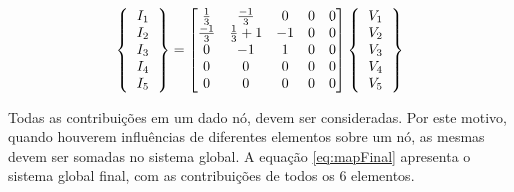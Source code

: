 \documentclass[
    12pt,               %
    openright,          %
    oneside,
    a4paper,            %
    english,            %
    french,             %
    spanish,            %
    brazil              %
    ]{abntex2}
\begin{document}
  \begin{equation}
     \label{eq:mapE2}
	\left \{
     \begin{tabular}{c}
         $I_1$ \\
         $I_2$ \\
         $I_3$ \\
         $I_4$ \\
         $I_5$          
     \end{tabular}       
     \right \}
     =
	  \begin{bmatrix}
	         \frac{1}{3} & \frac{-1}{3}  & 0 & 0 & 0 \\
	         \frac{-1}{3} & \frac{1}{3}+1  & -1 & 0 & 0 \\
	         0 & -1 & 1 & 0 & 0 \\
	         0 & 0 & 0 & 0 & 0 \\
	         0 & 0 & 0 & 0 & 0 \\
	     \end{bmatrix} 
	\left \{
     \begin{tabular}{c}
         $V_1$ \\
         $V_2$ \\
         $V_3$ \\
         $V_4$ \\
         $V_5$          
     \end{tabular}       
     \right \}	                     
  \end{equation}
  
  Todas as contribuições em um dado nó, devem ser consideradas. Por este motivo, quando houverem influências de diferentes elementos sobre um nó, as mesmas devem ser somadas no sistema global. A equação \ref{eq:mapFinal} apresenta o sistema global final, com as contribuições de todos os $6$ elementos.
  
\end{document}
